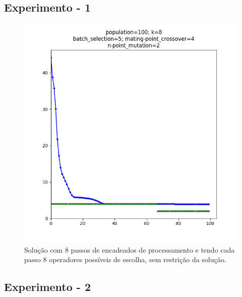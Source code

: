 \documentclass[fleqn,12pt]{SelfArx} %
\begin{document}
\pagebreak

\subsection{Experimento - 1}

\begin{figure}[ht]\centering
\includegraphics[width=\linewidth]{./experiments/media_and_steps_8_op_8}
\caption{Solução com 8 passos de encadeados de processamento e tendo cada passo
8 operadores possíveis de escolha, sem restrição da solução.}
\label{fig:media_and_steps_8_op_8}
\end{figure}

\medskip
\medskip
\medskip
\medskip
\medskip
\medskip
\medskip
\medskip
\medskip
\medskip
\medskip
\medskip
\medskip
\medskip
\medskip
\medskip
\medskip
\medskip
\medskip
\medskip

\pagebreak

\subsection{Experimento - 2}
\end{document}
